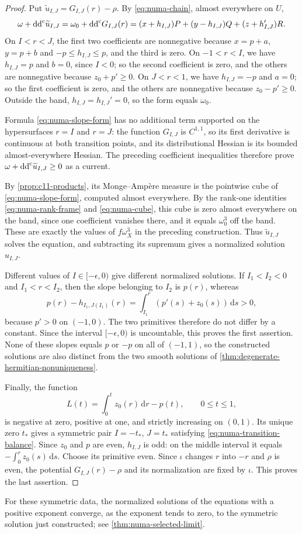 \begin{proof}
Put $\widetilde u_{I,J}=G_{I,J}(r)-\rho$. By \eqref{eq:numa-chain}, almost everywhere on $U$,
\begin{equation}\label{eq:numa-slope-form}
 \omega+\mathrm{dd}^{\mathrm{c}}\widetilde u_{I,J}
 =\omega_0+\mathrm{dd}^{\mathrm{c}} G_{I,J}(r)
 =(x+h_{I,J})P+(y-h_{I,J})Q+(z+h_{I,J}')R.
\end{equation}
On $I<r<J$, the first two coefficients are nonnegative because $x=p+a$, $y=p+b$ and $-p\leq h_{I,J}\leq p$, and the third is zero. On $-1<r<I$, we have $h_{I,J}=p$ and $b=0$, since $I<0$; so the second coefficient is zero, and the others are nonnegative because $z_0+p'\geq0$. On $J<r<1$, we have $h_{I,J}=-p$ and $a=0$; so the first coefficient is zero, and the others are nonnegative because $z_0-p'\geq0$. Outside the band, $h_{I,J}=h_{I,J}'=0$, so the form equals $\omega_0$.

Formula \eqref{eq:numa-slope-form} has no additional term supported on the hypersurfaces $r=I$ and $r=J$: the function $G_{I,J}$ is $C^{1,1}$, so its first derivative is continuous at both transition points, and its distributional Hessian is its bounded almost-everywhere Hessian. The preceding coefficient inequalities therefore prove $\omega+\mathrm{dd}^{\mathrm{c}}\widetilde u_{I,J}\geq0$ as a current.

By \cref{prop:c11-products}, its Monge--Amp\`ere measure is the pointwise cube of \eqref{eq:numa-slope-form}, computed almost everywhere. By the rank-one identities \eqref{eq:numa-rank-frame} and \eqref{eq:numa-cube}, this cube is zero almost everywhere on the band, since one coefficient vanishes there, and it equals $\omega_0^3$ off the band. These are exactly the values of $f\omega_X^3$ in the preceding construction. Thus $\widetilde u_{I,J}$ solves the equation, and subtracting its supremum gives a normalized solution $u_{I,J}$.

Different values of $I\in[-\epsilon,0)$ give different normalized solutions. If $I_1<I_2<0$ and $I_1<r<I_2$, then the slope belonging to $I_2$ is $p(r)$, whereas
\[
 p(r)-h_{I_1,J(I_1)}(r)
       =\int_{I_1}^r(p'(s)+z_0(s))\,\mathrm{d}s>0,
\]
because $p'>0$ on $(-1,0)$. The two primitives therefore do not differ by a constant. Since the interval $[-\epsilon,0)$ is uncountable, this proves the first assertion. None of these slopes equals $p$ or $-p$ on all of $(-1,1)$, so the constructed solutions are also distinct from the two smooth solutions of \cref{thm:degenerate-hermitian-nonuniqueness}.

Finally, the function
\[
 L(t)=\int_0^t z_0(r)\,\mathrm{d}r-p(t),\qquad 0\leq t\leq1,
\]
is negative at zero, positive at one, and strictly increasing on $(0,1)$. Its unique zero $t_*$ gives a symmetric pair $I=-t_*$, $J=t_*$ satisfying \eqref{eq:numa-transition-balance}. Since $z_0$ and $p$ are even, $h_{I,J}$ is odd: on the middle interval it equals $-\int_0^r z_0(s)\,\mathrm{d}s$. Choose its primitive even. Since $\iota$ changes $r$ into $-r$ and $\rho$ is even, the potential $G_{I,J}(r)-\rho$ and its normalization are fixed by $\iota$. This proves the last assertion.
\end{proof}

For these symmetric data, the normalized solutions of the equations with a positive exponent converge, as the exponent tends to zero, to the symmetric solution just constructed; see \cref{thm:numa-selected-limit}.
